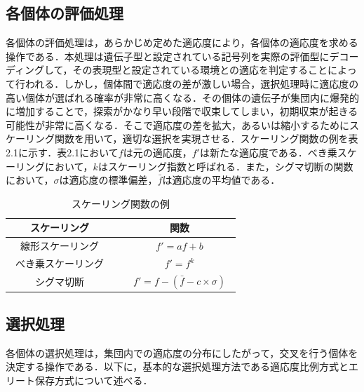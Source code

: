 \clearpage


\subsection{各個体の評価処理}
\label{sec2.1.2}
  
各個体の評価処理は，あらかじめ定めた適応度により，各個体の適応度を求める操作である．本処理は遺伝子型と設定されている記号列を実際の評価型にデコーディングして，その表現型と設定されている環境との適応を判定することによって行われる．しかし，個体間で適応度の差が激しい場合，選択処理時に適応度の高い個体が選ばれる確率が非常に高くなる．その個体の遺伝子が集団内に爆発的に増加することで，探索がかなり早い段階で収束してしまい，初期収束が起きる可能性が非常に高くなる．そこで適応度の差を拡大，あるいは縮小するためにスケーリング関数を用いて，適切な選択を実現させる．スケーリング関数の例を表2.1に示す．表2.1において$f$は元の適応度，$f'$は新たな適応度である．べき乗スケーリングにおいて，$k$はスケーリング指数と呼ばれる．また，シグマ切断の関数において，$\sigma$は適応度の標準偏差，$\bar{f}$は適応度の平均値である．



\begin{table}[!ht]
\caption{スケーリング関数の例}
\label{tb:sk}
\begin{center}
\begin{tabular}{|c||c|}\hline
スケーリング　&　関数　\\ \hline
線形スケーリング　&　$f'=af+b$　\\ \hline
べき乗スケーリング　&　$f'=f^{k}$　\\ \hline
シグマ切断　&　$f'=f-( \bar{f} - c \times \sigma )$　\\ \hline
\end{tabular}
\end{center}
\end{table}

\newpage


\subsection{選択処理}
\label{sec2.1.3}

各個体の選択処理は，集団内での適応度の分布にしたがって，交叉を行う個体を決定する操作である．以下に，基本的な選択処理方法である適応度比例方式とエリート保存方式について述べる．

